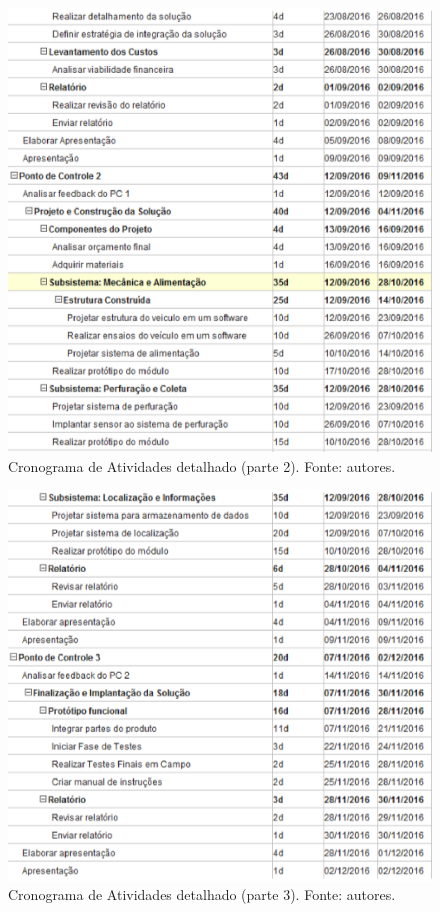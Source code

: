 \begin{apendicesenv}
\begin{figure}[!htbp]
  \centering
  \includegraphics[width=\textwidth]{figuras/cronograma_det_2.eps}
  \caption{Cronograma de Atividades detalhado (parte 2). Fonte: autores.}
  \label{fig:cron_d2}
\end{figure}

\vfill
\pagebreak

\begin{figure}[!htbp]
  \centering
  \includegraphics[width=\textwidth]{figuras/cronograma_det_3.eps}
  \caption{Cronograma de Atividades detalhado (parte 3). Fonte: autores.}
  \label{fig:cron_d3}
\end{figure}

\end{apendicesenv}
